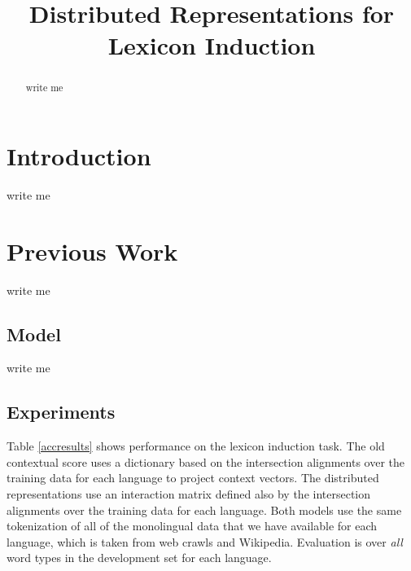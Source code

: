 \documentclass[11pt,letterpaper]{article}
\title{Distributed Representations for Lexicon Induction}
\date{}
\begin{document}
\maketitle
\begin{abstract}
write me
\end{abstract}

\section{Introduction}
write me

\section{Previous Work}
write me

\subsection{Model}
write me

\subsection{Experiments}

Table \ref{accresults} shows performance on the lexicon induction task. 
The old contextual score uses a dictionary based on the intersection alignments over the training data for each language to project context vectors.
The distributed representations use an interaction matrix defined also by the intersection alignments over the training data for each language.
Both models use the same tokenization of all of the monolingual data that we have available for each language, which is taken from web crawls and Wikipedia.
Evaluation is over {\it all} word types in the development set  for each language.
\end{document}
